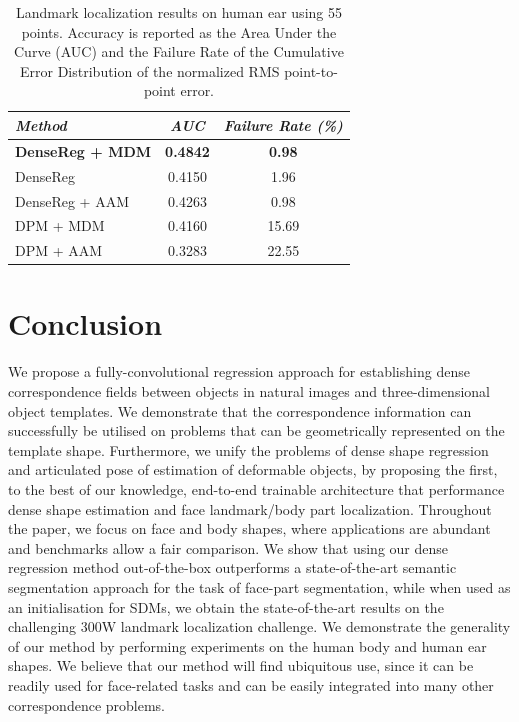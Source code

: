 \begin{table}
\centering
\begin{tabular}{|l|c|c|}
\hline
\emph{Method} & \emph{AUC} & \emph{Failure Rate (\%)}\\
\hline\hline
\textbf{DenseReg + MDM} & \textbf{0.4842} & \textbf{0.98} \\
DenseReg       &  0.4150 &   1.96 \\
DenseReg + AAM &  0.4263 &  0.98 \\
DPM + MDM      &  0.4160 &  15.69 \\
DPM + AAM      &  0.3283 &  22.55 \\
\hline
\end{tabular}
\caption{Landmark localization results on human ear using 55 points. Accuracy is reported as the Area Under the Curve (AUC) and the Failure Rate of the Cumulative Error Distribution of the normalized RMS point-to-point error.}
\label{tab:ears}
\end{table}


\section{Conclusion}\label{S:CONCLUSIONS}
We propose a fully-convolutional regression approach for establishing dense correspondence fields between objects in natural images and three-dimensional object templates. We demonstrate that the correspondence information can successfully be utilised on problems that can be geometrically represented on the template shape.
Furthermore, we unify the problems of dense shape regression and articulated pose of estimation of deformable objects, by proposing the first, to the best of our knowledge, end-to-end trainable architecture that performance dense shape estimation and face landmark/body part localization. Throughout the paper, we focus on face and body shapes, where applications are abundant and benchmarks allow a fair comparison. We show that using our dense regression method out-of-the-box  outperforms a state-of-the-art semantic segmentation approach for the task of face-part segmentation, while when used as an initialisation for SDMs,  we obtain the state-of-the-art results on the challenging 300W landmark localization challenge. We demonstrate the generality of our method by performing experiments on the human body and human ear shapes. We believe that our method will find ubiquitous use, since it can be readily used for face-related tasks and can be easily integrated into many other correspondence problems.

